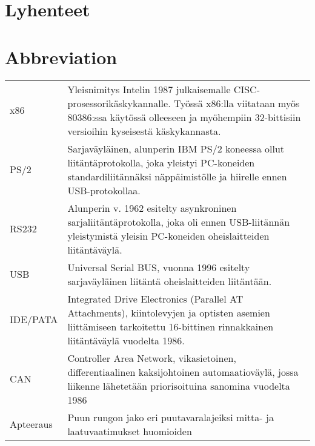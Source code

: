 \documentclass[11pt,a4paper,oneside,article]{memoir}
\begin{document}
\pagestyle{empty}
\setlength{\parskip}{1cm}
 {
  \chapter*{Lyhenteet}
} {
  \chapter*{Abbreviation}
}
\begin{table}[h]
\setlength{\tabcolsep}{8pt}
\renewcommand{\arraystretch}{2}
\begin{tabular}{l p{12cm}}
x86 & Yleisnimitys Intelin 1987 julkaisemalle CISC-prosessorikäskykannalle. Työssä x86:lla viitataan myös 80386:ssa käytössä olleeseen ja myöhempiin 32-bittisiin versioihin kyseisestä käskykannasta.\\
PS/2 & Sarjaväyläinen, alunperin IBM PS/2 koneessa ollut liitäntäprotokolla, joka yleistyi PC-koneiden standardiliitännäksi näppäimistölle ja hiirelle ennen USB-protokollaa.\\
RS232 & Alunperin v. 1962 esitelty asynkroninen sarjaliitäntäprotokolla, joka oli ennen USB-liitännän yleistymistä yleisin PC-koneiden oheislaitteiden liitäntäväylä.\\
USB & Universal Serial BUS, vuonna 1996 esitelty sarjaväyläinen liitäntä oheislaitteiden liitäntään.\\
IDE/PATA & Integrated Drive Electronics (Parallel AT Attachments), kiintolevyjen ja optisten asemien liittämiseen tarkoitettu 16-bittinen rinnakkainen liitäntäväylä vuodelta 1986.\\
CAN & Controller Area Network, vikasietoinen, differentiaalinen kaksijohtoinen automaatioväylä, jossa liikenne lähetetään priorisoituina sanomina vuodelta 1986\\
Apteeraus & Puun rungon jako eri puutavaralajeiksi mitta- ja laatuvaatimukset huomioiden\\
%
\end{tabular}
\end{table}

\newpage

\pagestyle{plain}
\end{document}
